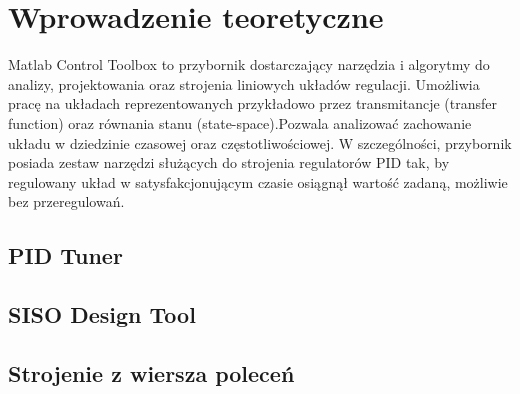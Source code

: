\chapter{Wprowadzenie teoretyczne}
\label{cha:wteoretyczny}
Matlab Control Toolbox to przybornik dostarczający narzędzia i algorytmy do analizy, projektowania oraz strojenia liniowych układów regulacji. Umożliwia pracę na układach reprezentowanych przykładowo przez transmitancje (transfer function) oraz równania stanu (state-space).Pozwala analizować zachowanie układu w dziedzinie czasowej oraz częstotliwościowej. W szczególności, przybornik posiada zestaw narzędzi służących do strojenia regulatorów PID tak, by regulowany układ w satysfakcjonującym czasie osiągnął wartość zadaną, możliwie bez przeregulowań.

\section{PID Tuner}
\label{sec:wpr_pidtune}


\section{SISO Design Tool}
\label{sec:wpr_pidtune}


\section{Strojenie z wiersza poleceń}
\label{sec:wpr_Command_Line_Tuning}
